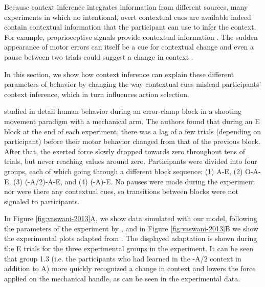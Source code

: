 \documentclass[a4paper,doc,floatsintext,natbib]{apa6}%
\def \fref #1{Figure \ref{#1}}     %
\begin{document}
Because context inference integrates information from different sources, many experiments in which no intentional, overt contextual cues are available indeed contain contextual information that the participant can use to infer the context. For example, proprioceptive signals  provide contextual information \citep{Dizio_Motor_1995,Shadmehr_Adaptive_1994}. The sudden appearance of motor errors can itself be a cue for contextual change \citep{Herzfeld_memory_2014} and even a pause between two trials could suggest a change in context \cite{Ethier_Spontaneous_2008}.

In this section, we show how context inference can explain these different parameters of behavior by changing the way contextual cues mislead participants' context inference, which in turn influences action selection.

\cite{Vaswani_Decay_2013} studied in detail human behavior during an error-clamp block in a shooting movement paradigm with a mechanical arm. The authors found that during an E block at the end of each experiment, there was a lag of a few trials (depending on participant) before their motor behavior changed from that of the previous block. After that, the exerted force slowly dropped towards zero throughout tens of trials, but never reaching values around zero. Participants were divided into four groups, each of which going through a different block sequence: (1) A-E, (2) O-A-E, (3) (-A/2)-A-E, and (4) (-A)-E. No pauses were made during the experiment nor were there any contextual cues, so transitions between blocks were not signaled to participants.

In \fref{fig:vaswani-2013}A, we show data simulated with our model, following the parameters of the experiment by \cite{Vaswani_Decay_2013}, and in \fref{fig:vaswani-2013}B we show the experimental plots adapted from \cite{Vaswani_Decay_2013}. The displayed adaptation is shown during the E trials for the three experimental groups in the experiment. It can be seen that group 1.3 (i.e. the participants who had learned in the -A/2 context in addition to A) more quickly recognized a change in context and lowers the force applied on the mechanical handle, as can be seen in the experimental data.
\end{document}
